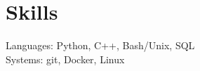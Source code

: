 \section{\sc Skills}

Languages: Python, C++, Bash/Unix, SQL \\
Systems: git, Docker, Linux%

\endinput
